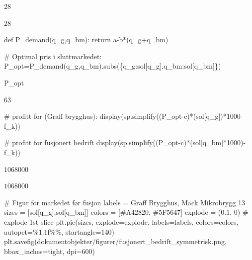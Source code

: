 \documentclass[
  12pt,
  a4paper,
  DIV=11,
  numbers=noendperiod]{scrartcl}
\newenvironment{Shaded}{\begin{snugshade}}{\end{snugshade}}
\newcommand{\CommentTok}[1]{\textcolor[rgb]{0.37,0.37,0.37}{#1}}
\newcommand{\ControlFlowTok}[1]{\textcolor[rgb]{0.00,0.23,0.31}{#1}}
\newcommand{\DecValTok}[1]{\textcolor[rgb]{0.68,0.00,0.00}{#1}}
\newcommand{\FloatTok}[1]{\textcolor[rgb]{0.68,0.00,0.00}{#1}}
\newcommand{\KeywordTok}[1]{\textcolor[rgb]{0.00,0.23,0.31}{#1}}
\newcommand{\NormalTok}[1]{\textcolor[rgb]{0.00,0.23,0.31}{#1}}
\newcommand{\OperatorTok}[1]{\textcolor[rgb]{0.37,0.37,0.37}{#1}}
\newcommand{\SpecialCharTok}[1]{\textcolor[rgb]{0.37,0.37,0.37}{#1}}
\newcommand{\StringTok}[1]{\textcolor[rgb]{0.13,0.47,0.30}{#1}}
\begin{document}
$\displaystyle 28$

$\displaystyle 28$

\begin{Shaded}
\begin{Highlighting}[]
\KeywordTok{def}\NormalTok{ P\_demand(q\_g,q\_bm):}
    \ControlFlowTok{return}\NormalTok{ a}\OperatorTok{{-}}\NormalTok{b}\OperatorTok{*}\NormalTok{(q\_g}\OperatorTok{+}\NormalTok{q\_bm)}

\CommentTok{\# Optimal pris i sluttmarkedet:}
\NormalTok{P\_opt}\OperatorTok{=}\NormalTok{P\_demand(q\_g,q\_bm).subs(\{q\_g:sol[q\_g],q\_bm:sol[q\_bm]\})}

\NormalTok{P\_opt}
\end{Highlighting}
\end{Shaded}

$\displaystyle 63$

\begin{Shaded}
\begin{Highlighting}[]
\CommentTok{\# profitt for (Graff brygghus):}
\NormalTok{display(sp.simplify((P\_opt}\OperatorTok{{-}}\NormalTok{c)}\OperatorTok{*}\NormalTok{(sol[q\_g])}\OperatorTok{*}\DecValTok{1000}\OperatorTok{{-}}\NormalTok{f\_k))}

\CommentTok{\# profitt for fusjonert bedrift}
\NormalTok{display(sp.simplify((P\_opt}\OperatorTok{{-}}\NormalTok{c)}\OperatorTok{*}\NormalTok{(sol[q\_bm]}\OperatorTok{*}\DecValTok{1000}\NormalTok{)}\OperatorTok{{-}}\NormalTok{f\_k))}
\end{Highlighting}
\end{Shaded}

$\displaystyle 1068000$

$\displaystyle 1068000$

\begin{Shaded}
\begin{Highlighting}[]
\CommentTok{\# Figur for markedet før fusjon}
\NormalTok{labels }\OperatorTok{=} \StringTok{\textquotesingle{}Graff Brygghus\textquotesingle{}}\NormalTok{, }\StringTok{\textquotesingle{}Mack Mikrobrygg 13\textquotesingle{}}
\NormalTok{sizes }\OperatorTok{=}\NormalTok{ [sol[q\_g],sol[q\_bm]]}
\NormalTok{colors }\OperatorTok{=}\NormalTok{ [}\StringTok{\textquotesingle{}\#A42820\textquotesingle{}}\NormalTok{, }\StringTok{\textquotesingle{}\#5F5647\textquotesingle{}}\NormalTok{]}
\NormalTok{explode }\OperatorTok{=}\NormalTok{ (}\FloatTok{0.1}\NormalTok{, }\DecValTok{0}\NormalTok{)  }\CommentTok{\# explode 1st slice}
\NormalTok{plt.pie(sizes, explode}\OperatorTok{=}\NormalTok{explode, labels}\OperatorTok{=}\NormalTok{labels, colors}\OperatorTok{=}\NormalTok{colors, autopct}\OperatorTok{=}\StringTok{\textquotesingle{}}\SpecialCharTok{\%1.1f\%\%}\StringTok{\textquotesingle{}}\NormalTok{, startangle}\OperatorTok{=}\DecValTok{140}\NormalTok{)}
\NormalTok{plt.savefig(}\StringTok{\textquotesingle{}dokumentobjekter/figurer/fusjonert\_bedrift\_symmetrisk.png\textquotesingle{}}\NormalTok{, bbox\_inches}\OperatorTok{=}\StringTok{\textquotesingle{}tight\textquotesingle{}}\NormalTok{, dpi}\OperatorTok{=}\DecValTok{600}\NormalTok{)}
\end{Highlighting}
\end{Shaded}
\end{document}
